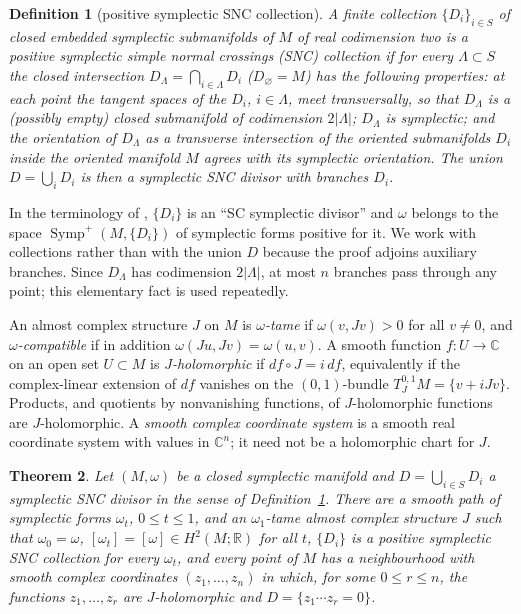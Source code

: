 \documentclass[11pt]{article}
\newtheorem{theorem}{Theorem}
\newtheorem{definition}[theorem]{Definition}
\theoremstyle{remark}
\newcommand{\C}{\mathbb C}
\newcommand{\R}{\mathbb R}
\newcommand{\Symp}{\operatorname{Symp}}
\begin{document}
\begin{definition}[positive symplectic SNC collection]\label{def:snc}
A finite collection $\{D_i\}_{i\in S}$ of closed embedded symplectic
submanifolds of $M$ of real codimension two is a \emph{positive
symplectic simple normal crossings (SNC) collection} if for every
$\Lambda\subset S$ the \emph{closed intersection}
$D_\Lambda=\bigcap_{i\in\Lambda}D_i$ ($D_\varnothing=M$) has the
following properties: at each point the tangent spaces of the $D_i$,
$i\in\Lambda$, meet transversally, so that $D_\Lambda$ is a (possibly
empty) closed submanifold of codimension $2|\Lambda|$; $D_\Lambda$ is
symplectic; and the orientation of $D_\Lambda$ as a transverse
intersection of the oriented
submanifolds $D_i$ inside the oriented manifold $M$ agrees with its
symplectic orientation. The union $D=\bigcup_iD_i$ is then a
\emph{symplectic SNC divisor} with \emph{branches} $D_i$.
\end{definition}

In the terminology of \cite{FMZ}, $\{D_i\}$ is an ``SC symplectic
divisor'' and $\omega$ belongs to the space $\Symp^+(M,\{D_i\})$ of
symplectic forms positive for it. We work with collections rather than
with the union $D$ because the proof adjoins auxiliary branches. Since
$D_\Lambda$ has codimension $2|\Lambda|$, at most $n$ branches pass
through any point; this elementary fact is used repeatedly.

An almost complex structure $J$ on $M$ is \emph{$\omega$-tame} if
$\omega(v,Jv)>0$ for all $v\neq0$, and \emph{$\omega$-compatible} if in
addition $\omega(Ju,Jv)=\omega(u,v)$. A smooth function $f\colon U\to\C$
on an open set $U\subset M$ is \emph{$J$-holomorphic} if
$df\circ J=i\,df$, equivalently if the complex-linear extension of $df$
vanishes on the $(0,1)$-bundle $T^{0,1}_JM=\{v+iJv\}$. Products, and
quotients by nonvanishing functions, of $J$-holomorphic functions are
$J$-holomorphic. A \emph{smooth complex coordinate system} is a smooth
real coordinate system with values in $\C^n$; it need not be a
holomorphic chart for $J$.

\begin{theorem}\label{thm:main}
Let $(M,\omega)$ be a closed symplectic manifold and $D=\bigcup_{i\in S}D_i$
a symplectic SNC divisor in the sense of Definition~\ref{def:snc}. There
are a smooth path of symplectic forms $\omega_t$, $0\le t\le1$, and an
$\omega_1$-tame almost complex structure $J$ such that $\omega_0=\omega$,
$[\omega_t]=[\omega]\in H^2(M;\R)$ for all $t$, $\{D_i\}$ is a positive
symplectic SNC collection for every $\omega_t$, and every point of $M$
has a neighbourhood with smooth complex coordinates $(z_1,\dots,z_n)$
in which, for some $0\le r\le n$, the functions $z_1,\dots,z_r$ are
$J$-holomorphic and $D=\{z_1\cdots z_r=0\}$.
\end{theorem}
\end{document}
